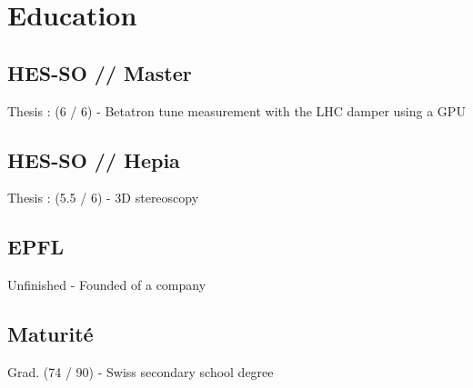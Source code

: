 \documentclass[a4paper]{deedy-resume} %
\begin{document}
\begin{minipage}[t]{0.33\textwidth} %


\section{Education}

\subsection{HES-SO // Master}

Thesis : (6 / 6) - Betatron tune measurement with the LHC damper using a GPU \\

\sectionspace %

\subsection{HES-SO // Hepia}

Thesis : (5.5 / 6) - 3D stereoscopy \\

\sectionspace %


\subsection{EPFL}

Unfinished - Founded of a company \\

\sectionspace


\subsection{Maturité}

Grad. (74 / 90) - Swiss secondary school degree \\


\end{minipage}
\end{document}
